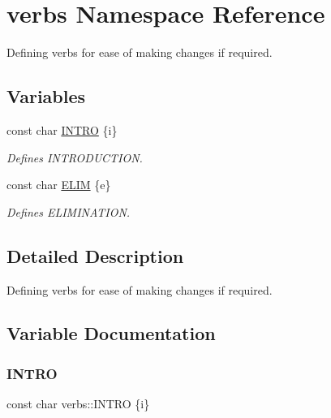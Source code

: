 \hypertarget{namespaceverbs}{}\section{verbs Namespace Reference}
\label{namespaceverbs}


Defining verbs for ease of making changes if required.  


\subsection*{Variables}
\begin{DoxyCompactItemize}
\item 
const char \mbox{\hyperlink{namespaceverbs_a160cd2b49b96eb11b6db907bf94b5c3a}{I\+N\+T\+RO}} \{\textquotesingle{}i\textquotesingle{}\}
\begin{DoxyCompactList}\small\item\em Defines I\+N\+T\+R\+O\+D\+U\+C\+T\+I\+ON. \end{DoxyCompactList}\item 
const char \mbox{\hyperlink{namespaceverbs_ae28355cc9321ebee9abcd23bb6e1b836}{E\+L\+IM}} \{\textquotesingle{}e\textquotesingle{}\}
\begin{DoxyCompactList}\small\item\em Defines E\+L\+I\+M\+I\+N\+A\+T\+I\+ON. \end{DoxyCompactList}\end{DoxyCompactItemize}


\subsection{Detailed Description}
Defining verbs for ease of making changes if required. 

\subsection{Variable Documentation}
\mbox{\label{namespaceverbs_a160cd2b49b96eb11b6db907bf94b5c3a}} 
\subsubsection{\texorpdfstring{I\+N\+T\+RO}{INTRO}}
{\footnotesize\ttfamily const char verbs\+::\+I\+N\+T\+RO \{\textquotesingle{}i\textquotesingle{}\}}



